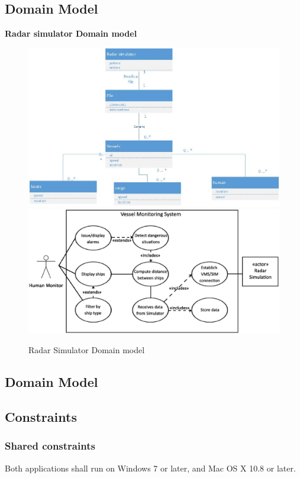 \documentclass{article}
\begin{document}
\subsection{Domain Model}
\noindent
{\bf Radar simulator Domain model}\\
\begin{figure}[h]
\caption{Radar Simulator Domain model}
\includegraphics{DMusecase}
\includegraphics[width=\linewidth]{vmsdiagram.eps}
\end{figure}
\subsection{Domain Model} %

\subsection{Constraints} %

\subsubsection{Shared constraints}
Both applications shall run on Windows 7 or later, and Mac OS X 10.8 or later.
\end{document}
